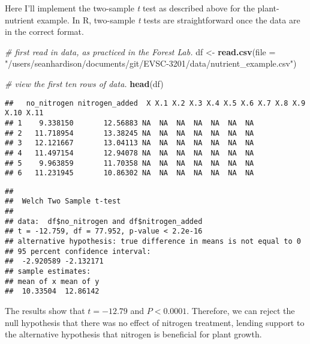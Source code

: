 \documentclass[]{book}
\newenvironment{Shaded}{\begin{snugshade}}{\end{snugshade}}
\newcommand{\KeywordTok}[1]{\textcolor[rgb]{0.13,0.29,0.53}{\textbf{#1}}}
\newcommand{\DataTypeTok}[1]{\textcolor[rgb]{0.13,0.29,0.53}{#1}}
\newcommand{\StringTok}[1]{\textcolor[rgb]{0.31,0.60,0.02}{#1}}
\newcommand{\CommentTok}[1]{\textcolor[rgb]{0.56,0.35,0.01}{\textit{#1}}}
\newcommand{\OperatorTok}[1]{\textcolor[rgb]{0.81,0.36,0.00}{\textbf{#1}}}
\newcommand{\NormalTok}[1]{#1}
\begin{document}
Here I'll implement the two-sample \emph{t} test as described above for
the plant-nutrient example. In R, two-sample \emph{t} tests are
straightforward once the data are in the correct format.

\begin{Shaded}
\begin{Highlighting}[]
\CommentTok{# first read in data, as practiced in the Forest Lab.}
\NormalTok{df <-}\StringTok{ }\KeywordTok{read.csv}\NormalTok{(}\DataTypeTok{file =} \StringTok{"/users/seanhardison/documents/git/EVSC-3201/data/nutrient_example.csv"}\NormalTok{)}

\CommentTok{# view the first ten rows of data. }
\KeywordTok{head}\NormalTok{(df)}
\end{Highlighting}
\end{Shaded}

\begin{verbatim}
##   no_nitrogen nitrogen_added  X X.1 X.2 X.3 X.4 X.5 X.6 X.7 X.8 X.9 X.10 X.11
## 1    9.338150       12.56883 NA  NA  NA  NA  NA  NA  NA                      
## 2   11.718954       13.38245 NA  NA  NA  NA  NA  NA  NA                      
## 3   12.121667       13.04113 NA  NA  NA  NA  NA  NA  NA                      
## 4   11.497154       12.94078 NA  NA  NA  NA  NA  NA  NA                      
## 5    9.963859       11.70358 NA  NA  NA  NA  NA  NA  NA                      
## 6   11.231945       10.86302 NA  NA  NA  NA  NA  NA  NA
\end{verbatim}

\begin{Shaded}
\end{Shaded}

\begin{verbatim}
## 
##  Welch Two Sample t-test
## 
## data:  df$no_nitrogen and df$nitrogen_added
## t = -12.759, df = 77.952, p-value < 2.2e-16
## alternative hypothesis: true difference in means is not equal to 0
## 95 percent confidence interval:
##  -2.920589 -2.132171
## sample estimates:
## mean of x mean of y 
##  10.33504  12.86142
\end{verbatim}

The results show that \(t = -12.79\) and \(P < 0.0001\). Therefore, we
can reject the null hypothesis that there was no effect of nitrogen
treatment, lending support to the alternative hypothesis that nitrogen
is beneficial for plant growth.
\end{document}
